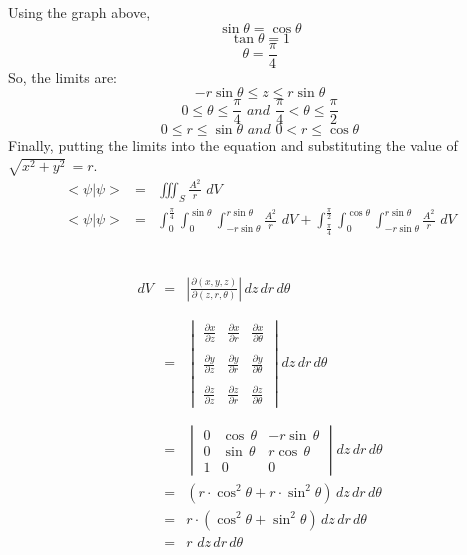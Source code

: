\documentclass{article}
\begin{document}
{%
Using the graph above,\\
$$\sin\theta=\cos\theta$$
$$\tan\theta = 1$$
$$\theta = \frac{\pi}{4}$$
So, the limits are:\\
$$ -r\sin\theta \leq z \leq r\sin\theta$$
$$0\leq \theta\leq \frac{\pi}{4} \,\,and \,\,\frac{\pi}{4} < \theta\leq \frac{\pi}{2} $$
$$0\leq r \leq \sin\theta \,\,and \,\,0 < r \leq \cos\theta$$
Finally, putting the limits into the equation and substituting the value of $\sqrt{x^2+y^2}\, = r$.
\begin{eqnarray*}
        <\psi|\psi> &=&\iiint_S \frac{A^2}{r} \,\, dV\\
        <\psi|\psi>&=& \int_{0}^{\frac{\pi}{4}}\int_{0}^{\sin\theta}\int_{-r\sin\theta}^{r\sin\theta} \frac{A^2}{r} \,\, dV + \int_{\frac{\pi}{4}}^{\frac{\pi}{2}}\int_{0}^{\cos\theta}\int_{-r\sin\theta}^{r\sin\theta} \frac{A^2}{r} \,\, dV  \\
\end{eqnarray*}
}

\subsection{}%

\large{

\begin{eqnarray*}
        dV  &=&|\frac{\partial(x,y,z)}{\partial(z,r,\theta)}|\, dz\,dr\,d\theta\\\\\\
        &=&\begin{vmatrix} \frac{\partial x}{\partial z} & \frac{\partial x}{\partial r} & \frac{\partial x}{\partial \theta} \\\\ \frac{\partial y}{\partial z} & \frac{\partial y}{\partial r} & \frac{\partial y}{\partial \theta} \\\\ \frac{\partial z}{\partial z} & \frac{\partial z}{\partial r} & \frac{\partial z}{\partial \theta} \end{vmatrix} dz\,dr\,d\theta \\\\\\
        &=&\begin{vmatrix} 0 &\cos\,\theta &  -r\sin\,\theta  \\ 0 & \sin\,\theta & r\cos\,\theta  \\ 1 & 0 & 0 \end{vmatrix} dz\,dr\,d\theta \\
        &=& (r\cdot \cos^2 \theta + r \cdot \sin^2 \theta) \,dz\,dr\,d\theta\\
        &=& r\cdot (\cos^2 \theta + \sin^2 \theta) \,dz\,dr\,d\theta\\
        &=& r\,\,dz\,dr\,d\theta\\
\end{eqnarray*}
}
\pagebreak
\end{document}

